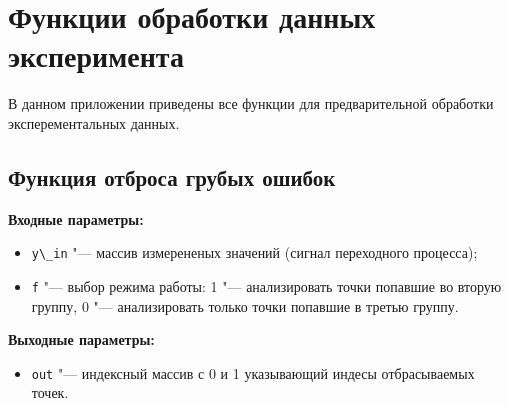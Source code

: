 \chapter{Функции обработки данных эксперимента} \label{Appendix:FPE}

В данном приложении приведены все функции для предварительной обработки эксперементальных данных.

\section{Функция отброса грубых ошибок}\label{Appendix:FPE:DGE}

\noindent\textbf{Входные параметры:}
\begin{itemize}[leftmargin=1.25cm]
	\item [] \lstinline{y\_in} "--- массив измерененых значений (сигнал переходного процесса);
	\item [] \lstinline{f} "--- выбор режима работы: 1 "--- анализировать точки попавшие во вторую группу, 0 "--- анализировать только точки попавшие в третью группу.
\end{itemize}
\textbf{Выходные параметры:}
\begin{itemize}[leftmargin=1.25cm]
	\item [] \lstinline{out} "--- индексный массив с 0 и 1 указывающий индесы отбрасываемых точек.
\end{itemize}


